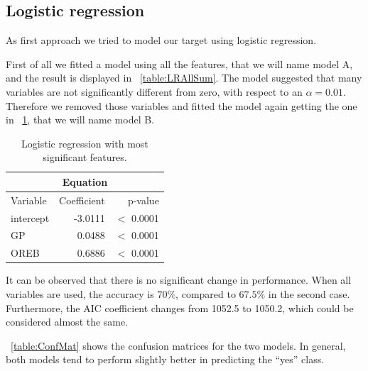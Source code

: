 \subsection{Logistic regression}

As first approach we tried to model our target using logistic regression.

First of all we fitted a model using all the features, that we will name model A, and the result is displayed in \Tab~\ref{table:LRAllSum}. The model suggested that many variables are not significantly different from zero, with respect to an $\alpha = 0.01$. Therefore we removed those variables and fitted the model again getting the one in \Tab~\ref{table:LRImpSum}, that we will name model B.

\begin{table}[H]
	\centering
	\begin{tabular}{|| l | r | r ||} 
		\hline
		\multicolumn{3}{|c|}{Equation} \\
		\hline
		Variable & Coefficient & p-value \\
		\hline
		intercept & -3.0111 & $<$ 0.0001 \\
		GP & 0.0488 & $<$ 0.0001 \\
		OREB & 0.6886 & $<$ 0.0001 \\	
		\hline
	\end{tabular}
	\caption{Logistic regression with most significant features.}
	\label{table:LRImpSum}
\end{table}

It can be observed that there is no significant change in performance. When all variables are used, the accuracy is $70\%$, compared to $67.5\%$ in the second case. Furthermore, the AIC coefficient changes from 1052.5 to 1050.2, which could be considered almost the same. 

\Tab~\ref{table:ConfMat} shows the confusion matrices for the two models. In general, both models tend to perform slightly better in predicting the ``yes'' class.

